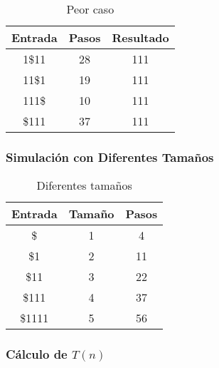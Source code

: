\documentclass{uc3mpracticas}
\begin{document}
  \begin{table}[!h]
    \centering
  \begin{tabular}{|c|c|c|}
  \hline
  \textbf{Entrada} & \textbf{Pasos} & \textbf{Resultado} \\ \hline
  1\$11            & 28             & 111              \\ \hline
  11\$1            & 19             & 111              \\ \hline
  111\$            & 10             & 111              \\ \hline
  \$111            & 37             & 111              \\ \hline
  \end{tabular}
  \caption{Peor caso}
  \end{table}


  \subsubsection{Simulación con Diferentes Tamaños}
  \begin{table}[!h]
    \centering
  \begin{tabular}{|c|c|c|}
  \hline
  \textbf{Entrada} & \textbf{Tamaño} & \textbf{Pasos} \\ \hline
  \$               & 1               & 4              \\ \hline
  \$1              & 2               & 11             \\ \hline
  \$11             & 3               & 22             \\ \hline
  \$111            & 4               & 37             \\ \hline
  \$1111           & 5               & 56             \\ \hline
  \end{tabular}
  \caption{Diferentes tamaños}
  \end{table}


  \subsubsection{Cálculo de $T(n)$}
\end{document}
